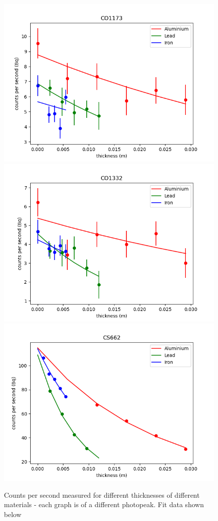 \documentclass[11pt]{article} %
\begin{document}
\begin{figure}[H]
            \includegraphics[scale=0.4]{assets/CO1173.png}
            \includegraphics[scale=0.4]{assets/CO1332.png}
            \includegraphics[scale=0.4]{assets/CS662.png}
            \caption{Counts per second measured for different thicknesses of different materials - each graph is of a different photopeak. Fit data shown below}
        \end{figure}
\end{document}
